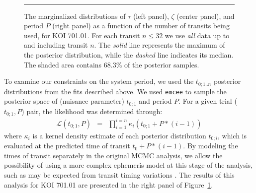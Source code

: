 \begin{figure}[t] 
\begin{center} 
\mbox{
\quad
{}
\quad
{}
}
\caption{The marginalized distributions of $\tau$ (left panel),
  $\zeta$ (center panel), and period $P$ (right panel) as a function
  of the number of transits being used, for KOI 701.01.  For each
  transit $n \leq 32$ we use {\it all} data up to and including
  transit $n$.  The {\it solid} line
  represents the maximum of the posterior distribution, while the {\it
  dashed} line indicates its median.  The shaded area contains 68.3\%
  of the posterior samples.}
\hspace*{\fill}  
\hrule
\label{fig-marg} 
\end{center} 
\end{figure}

To examine our constraints on the system period, we used the
$t_{0;1..n}$ posterior distributions from the fits described above.
We used {\tt emcee} to sample the posterior space of (nuisance
parameter) $t_{0;1}$ and period $P$.  For a given trial ($t_{0;1}, P$)
pair, the likelihood was determined through:
\begin{eqnarray}
\mathcal{L}(t_{0;1}, P) & = & \prod_{i=1}^{i=n} \kappa_i(t_{0;1} + P * (i-1))
\end{eqnarray}
where $\kappa_i$ is a kernel density estimate of each posterior
distribution $t_{0;i}$, which is evaluated at the predicted time of
transit $t_0 + P * (i-1)$.  By modeling the times of transit
separately in the original MCMC analysis, we allow the possibility of
using a more complex ephemeris model at this stage of the analysis,
such as may be expected from transit timing variations
\citep{2005MNRAS.359..567A,2005Sci...307.1288H}.  The results of this
analysis for KOI 701.01 are presented in the right panel of
Figure~\ref{fig-marg}.

